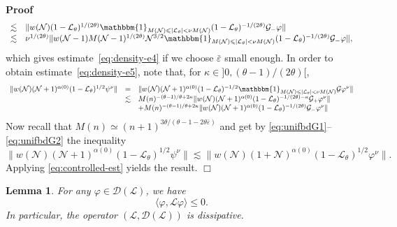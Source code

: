 \documentclass{article}
\newenvironment{proof}{\noindent\textbf{Proof\ }}{\hspace*{\fill}$\Box$\medskip}
\newtheorem{lemma}{Lemma}
\begin{document}
\begin{proof}
\[\begin{array}{ll}
       \lesssim & \| w (\mathcal{N}) (1 -\mathcal{L}_{\theta})^{1 / (2
       \theta)} \mathbbm{1}_{M (\mathcal{N}) \leqslant | \mathcal{L}_{\theta}
       | < \nu M (\mathcal{N})} (1 -\mathcal{L}_{\theta})^{- 1 / (2 \theta)}
       \mathcal{G}_- \varphi \|\\
       \lesssim & \nu^{1 / (2 \theta)} \| w (\mathcal{N}- 1) M (\mathcal{N}-
       1)^{1 / (2 \theta)} \mathcal{N}^{3 / 2} \mathbbm{1}_{M (\mathcal{N})
       \leqslant | \mathcal{L}_{\theta} | < \nu M (\mathcal{N})} (1
       -\mathcal{L}_{\theta})^{- 1 / (2 \theta)} \mathcal{G}_- \varphi \|,
     \end{array} \]
  which gives estimate~{\eqref{eq:density-e4}} if we choose
  $\bar{\varepsilon}$ small enough. In order to obtain
  estimate~{\eqref{eq:density-e5}}, note that, for $\kappa \in] 0, (\theta -
  1) / (2 \theta) [$,
  \[ \begin{array}{lll}
       \| w (\mathcal{N}) (\mathcal{N}+ 1)^{\alpha (0)} (1
       -\mathcal{L}_{\theta})^{1 / 2} \psi^{\nu} \| & = & \| w (\mathcal{N})
       (\mathcal{N}+ 1)^{\alpha (0)} (1 -\mathcal{L}_{\theta})^{- 1 / 2}
       \mathbbm{1}_{M (\mathcal{N}) \leqslant | \mathcal{L}_{\theta} | < \nu M
       (\mathcal{N})} \mathcal{G} \varphi^{\nu} \|\\
       & \lesssim & M (n)^{- (\theta - 1) / \theta + 2 \kappa} \| w
       (\mathcal{N}) (\mathcal{N}+ 1)^{\alpha (0)} (1
       -\mathcal{L}_{\theta})^{- 1 / (2 \theta) - \kappa} \mathcal{G}_+
       \varphi^{\nu} \|\\
       &  & + M (n)^{- (\theta - 1) / \theta + 2 \kappa} \| w (\mathcal{N})
       (\mathcal{N}+ 1)^{\alpha (0)} (1 -\mathcal{L}_{\theta})^{- 1 / (2
       \theta)} \mathcal{G}_- \varphi^{\nu} \|
     \end{array} \]
  Now recall that $M (n) \simeq (n + 1)^{3 \theta / (\theta - 1 - 2 \theta
  \bar{\varepsilon})}$ and get by {\eqref{eq:unifbdG1}}--{\eqref{eq:unifbdG2}}
  the inequality
  \[ \| w (\mathcal{N}) (\mathcal{N}+ 1)^{\alpha (0)} (1
     -\mathcal{L}_{\theta})^{1 / 2} \psi^{\nu} \| \lesssim \| w (\mathcal{N})
     (1 +\mathcal{N})^{\alpha (0)} (1 -\mathcal{L}_{\theta})^{1 / 2}
     \varphi^{\nu} \| . \]
  Applying {\eqref{eq:controlled-est}} yields the result.
\end{proof}

\begin{lemma}
  \label{lem:diss}For any $\varphi \in \mathcal{D} (\mathcal{L})$, we have
  \[ \langle \varphi, \mathcal{L} \varphi \rangle \leqslant 0. \]
  In particular, the operator $(\mathcal{L}, \mathcal{D} (\mathcal{L}))$ is
  dissipative.
\end{lemma}
\end{document}
